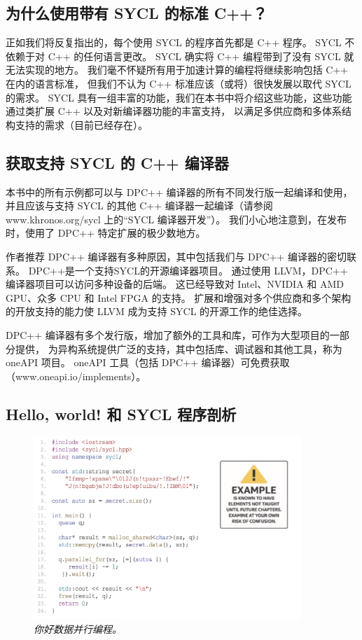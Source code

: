 \subsection{为什么使用带有 SYCL 的标准 C++？}
正如我们将反复指出的，每个使用 SYCL 的程序首先都是 C++ 程序。 SYCL 不依赖于对 C++ 的任何语言更改。 
SYCL 确实将 C++ 编程带到了没有 SYCL 就无法实现的地方。 
我们毫不怀疑所有用于加速计算的编程将继续影响包括 C++ 在内的语言标准，
但我们不认为 C++ 标准应该（或将）很快发展以取代 SYCL 的需求。 
SYCL 具有一组丰富的功能，我们在本书中将介绍这些功能，这些功能通过类扩展 C++ 以及对新编译器功能的丰富支持，
以满足多供应商和多体系结构支持的需求（目前已经存在）。

\subsection{获取支持 SYCL 的 C++ 编译器}
本书中的所有示例都可以与 DPC++ 编译器的所有不同发行版一起编译和使用，
并且应该与支持 SYCL 的其他 C++ 编译器一起编译（请参阅 www.khronos.org/sycl 上的“SYCL 编译器开发”）。 
我们小心地注意到，在发布时，使用了 DPC++ 特定扩展的极少数地方。

作者推荐 DPC++ 编译器有多种原因，其中包括我们与 DPC++ 编译器的密切联系。 DPC++是一个支持SYCL的开源编译器项目。 
通过使用 LLVM，DPC++ 编译器项目可以访问多种设备的后端。 
这已经导致对 Intel、NVIDIA 和 AMD GPU、众多 CPU 和 Intel FPGA 的支持。 
扩展和增强对多个供应商和多个架构的开放支持的能力使 LLVM 成为支持 SYCL 的开源工作的绝佳选择。

DPC++ 编译器有多个发行版，增加了额外的工具和库，可作为大型项目的一部分提供，
为异构系统提供广泛的支持，其中包括库、调试器和其他工具，称为 oneAPI 项目。 
oneAPI 工具（包括 DPC++ 编译器）可免费获取（www.oneapi.io/implements）。

\subsection{Hello, world! 和 SYCL 程序剖析}

\begin{figure}[H]
	\centering
	\includegraphics[width=0.9\textwidth]{figs/F1.1.png}
	\caption{\textit{你好数据并行编程。}}
\end{figure}

